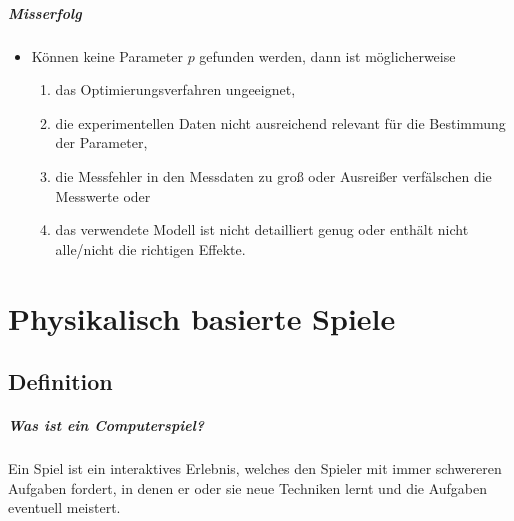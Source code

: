 \documentclass[a4paper, 11pt, accentcolor = tud3b]{tudreport}
\begin{document}
                \paragraph{Misserfolg}
	                \begin{itemize}
	                	\item Können keine Parameter \(p\) gefunden werden, dann ist möglicherweise
		                	\begin{enumerate}
		                		\item das Optimierungsverfahren ungeeignet,
		                		\item die experimentellen Daten nicht ausreichend relevant für die Bestimmung der Parameter,
		                		\item die Messfehler in den Messdaten zu groß oder Ausreißer verfälschen die Messwerte oder
		                		\item das verwendete Modell ist nicht detailliert genug oder enthält nicht alle/nicht die richtigen Effekte.
		                	\end{enumerate}
                	\end{itemize}

    \chapter{Physikalisch basierte Spiele} %
        \section{Definition} %
            \paragraph{Was ist ein Computerspiel?}
	            Ein Spiel ist ein interaktives Erlebnis, welches den Spieler mit immer schwereren Aufgaben fordert, in denen er oder sie neue Techniken lernt und die Aufgaben eventuell meistert.
	            
\end{document}
